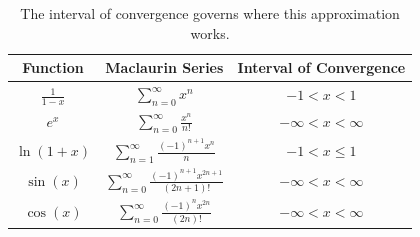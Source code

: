 \documentclass[12pt,english]{scrartcl}
\theoremstyle{definition}
\theoremstyle{remark}
\begin{document}
\begin{table}[ht]
    \centering
    \sffamily
    \begin{tabular}{ccc}
         \toprule
         \textbf{Function} & \textbf{Maclaurin Series} & \textbf{Interval of Convergence} \\
         \midrule
         $\displaystyle \frac{1}{1-x}$ & $\displaystyle \sum_{n=0}^{\infty} x^{n}$  & $-1 < x < 1$ \\ [1.6em]
         $\displaystyle e^{x}$ & $\displaystyle \sum_{n=0}^{\infty} \frac{x^{n}}{n!}$  & $-\infty < x < \infty$ \\ [1.6em]
         $\displaystyle \ln(1+x)$ & $\displaystyle \sum_{n=1}^{\infty} \frac{(-1)^{n+1}x^{n}}{n}$  & $-1 < x \leq 1$ \\ [1.6em]
         $\displaystyle \sin(x)$ & $\displaystyle \sum_{n=0}^{\infty} \frac{(-1)^{n+1}x^{2n+1}}{(2n+1)!}$ & $-\infty < x < \infty$ \\ [1.6em]
         $\displaystyle \cos(x)$ & $\displaystyle \sum_{n=0}^{\infty} \frac{(-1)^{n}x^{2n}}{(2n)!}$ & $-\infty < x < \infty$ \\
         \bottomrule
    \end{tabular}
    \caption{The interval of convergence governs where this approximation works.}
    \label{tab:common_maclaurin}
\end{table}
\end{document}
